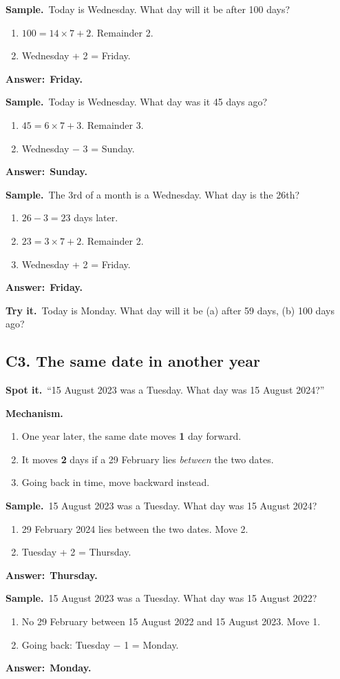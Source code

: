\documentclass[11pt,a4paper]{article}
\let\oldsubsection\subsection
\renewcommand{\subsection}{\needspace{9\baselineskip}\oldsubsection}
\newcommand{\spot}{\textbf{\color{ember}Spot it.}\ }
\newcommand{\mech}{\textbf{\color{ember}Mechanism.}\ }
\newif\ifkeepsamp
\newcommand{\ans}[1]{\par\nopagebreak\noindent\textbf{\color{ember}Answer:}\ \textbf{#1}\par}
\newcommand{\samp}{\ifkeepsamp\needspace{4\baselineskip}\fi\textbf{\color{ember}Sample.}\ }
\newcommand{\tryit}[1]{\textbf{\color{ember}Try it.}\ #1}
\begin{document}
\samp Today is Wednesday. What day will it be after 100 days?
\begin{enumerate}
\item $100 = 14 \times 7 + 2$. Remainder 2.
\item Wednesday + 2 = Friday.
\end{enumerate}
\ans{Friday.}

\samp Today is Wednesday. What day was it 45 days ago?
\begin{enumerate}
\item $45 = 6 \times 7 + 3$. Remainder 3.
\item Wednesday $-$ 3 = Sunday.
\end{enumerate}
\ans{Sunday.}

\samp The 3rd of a month is a Wednesday. What day is the 26th?
\begin{enumerate}
\item $26 - 3 = 23$ days later.
\item $23 = 3 \times 7 + 2$. Remainder 2.
\item Wednesday + 2 = Friday.
\end{enumerate}
\ans{Friday.}

\tryit Today is Monday. What day will it be (a) after 59 days, (b) 100 days ago?

\subsection{C3. The same date in another year}
\spot ``15 August 2023 was a Tuesday. What day was 15 August 2024?''

\mech
\begin{enumerate}
\item One year later, the same date moves \textbf{1} day forward.
\item It moves \textbf{2} days if a 29 February lies \emph{between} the two dates.
\item Going back in time, move backward instead.
\end{enumerate}

\samp 15 August 2023 was a Tuesday. What day was 15 August 2024?
\begin{enumerate}
\item 29 February 2024 lies between the two dates. Move 2.
\item Tuesday + 2 = Thursday.
\end{enumerate}
\ans{Thursday.}

\samp 15 August 2023 was a Tuesday. What day was 15 August 2022?
\begin{enumerate}
\item No 29 February between 15 August 2022 and 15 August 2023. Move 1.
\item Going back: Tuesday $-$ 1 = Monday.
\end{enumerate}
\ans{Monday.}
\end{document}
